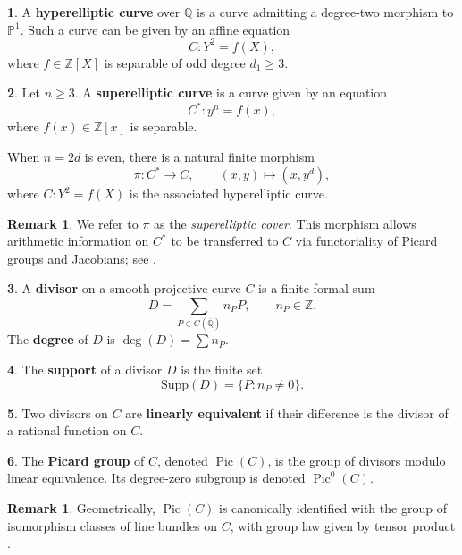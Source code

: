 \documentclass[12pt, reqno]{amsart}
\DeclareMathOperator{\Pic}{Pic}
\numberwithin{equation}{section}
\theoremstyle{definition}
\newtheorem{remark}[thm]{Remark}
\theoremstyle{nodefstyle}
\newtheorem*{define}{}
\begin{document}
\begin{define}
    

A \textbf{hyperelliptic curve} over $\mathbb{Q}$ is a curve admitting a degree-two morphism
to $\mathbb{P}^1$. Such a curve can be given by an affine equation
\[
C : Y^2 = f(X),
\]
where $f \in \mathbb{Z}[X]$ is separable of odd degree $d_1 \ge 3$.
\end{define}

\begin{define}
Let $n \ge 3$. A \textbf{superelliptic curve} is a curve given by an equation
\[
C^\ast : y^n = f(x),
\]
where $f(x) \in \mathbb{Z}[x]$ is separable.
\end{define}

When $n = 2d$ is even, there is a natural finite morphism
\[
\pi : C^\ast \longrightarrow C,
\qquad
(x,y) \longmapsto (x,y^d),
\]
where $C : Y^2 = f(X)$ is the associated hyperelliptic curve.

\begin{remark}
We refer to $\pi$ as the \emph{superelliptic cover}. This morphism allows arithmetic
information on $C^\ast$ to be transferred to $C$ via functoriality of Picard groups and
Jacobians; see \cite[Chapter~IV]{Silverman1994}.
\end{remark}



\begin{define}
A \textbf{divisor} on a smooth projective curve $C$ is a finite formal sum
\[
D = \sum_{P \in C(\overline{\mathbb{Q}})} n_P P,
\qquad n_P \in \mathbb{Z}.
\]
The \textbf{degree} of $D$ is $\deg(D) = \sum n_P$.
\end{define}

\begin{define}
The \textbf{support} of a divisor $D$ is the finite set
\[
\mathrm{Supp}(D) = \{ P : n_P \neq 0 \}.
\]
\end{define}

\begin{define}
Two divisors on $C$ are \textbf{linearly equivalent} if their difference is the divisor of a
rational function on $C$.
\end{define}

\begin{define}
The \textbf{Picard group} of $C$, denoted $\Pic(C)$, is the group of divisors modulo linear
equivalence. Its degree-zero subgroup is denoted $\Pic^0(C)$.
\end{define}

\begin{remark}
Geometrically, $\Pic(C)$ is canonically identified with the group of isomorphism classes
of line bundles on $C$, with group law given by tensor product
\cite[Chapter~IV]{Hartshorne1977}.
\end{remark}
\end{document}
